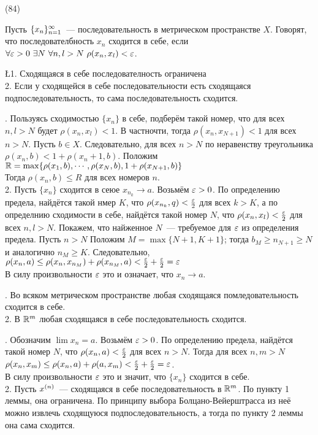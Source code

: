 (84)

\Op Пусть $\{x_{n}\}^{\infty}_{n = 1}$~--- последовательность в метрическом пространстве $X$. Говорят, что последователбность $x_n$ сходится в себе, если\\
$\forall \varepsilon > 0\ \exists N\ \forall n, l > N\ \rho(x_n, x_l) < \varepsilon$.

\L 1. Сходящаяся в себе последователность ограничена\\
2. Если у сходящейся в себе последовательности есть сходящаяся подпоследовательность, то сама последовательность сходится.

. Пользуясь сходимостью $\{x_n\}$ в себе, подберём такой номер, что для всех $n, l > N$ будет $\rho(x_n, x_l) < 1$. В частночти, тогда $\rho(x_n, x_{N + 1}) < 1$ для всех $n > N$. Пусть $b \in X$. Следовательно, для всех $n > N$ по неравенству треугольника $\rho(x_n, b) < 1 + \rho(x_n + 1, b)$. Положим\\
$\mathbb{R} = \max\{\rho(x_1, b), \cdots, \rho(x_N, b), 1 + \rho(x_{N + 1}, b)\}$\\
Тогда $\rho(x_n, b) \le R$ для всех номеров $n$.\\
2. Пусть $\{x_n\}$ сходится в сеюе $x_{n_k} \to a$. Возьмём $\varepsilon > 0$. По определению предела, найдётся такой нмер $K$, что $\rho(x_{n_k}, q) < \frac{\varepsilon}{2}$ для всех $k > K$, а по определнию сходимости в себе, найдётся такой номер $N$, что $\rho(x_n, x_l) < \frac{\varepsilon}{2}$ для всех $n, l > N$. Покажем, что найженное $N$~--- требуемое для $\varepsilon$ из определения предела. Пусть $n > N$ Положим $M = \max\{N +1, K +1\}$; тогда $b_M \ge n_{N + 1} \ge N$ и аналогично $n_M \ge K$. Следовательно,\\
$\rho(x_n, a) \le \rho(x_n, x_{n_M}) + \rho(x_{n_M}, a) < \frac{\varepsilon}{2} + \frac{\varepsilon}{2} = \varepsilon$\\
В силу произвольности $\varepsilon$ это и означает, что $x_n \to a$.

. Во всяком метрическом пространстве любая сходящаяся помледовательность сходится в себе.\\
2. В $\mathbb{R}^m$ любая сходящаяся в себе последовательность сходится.

. Обозначим $\lim x_n = a$. Возьмём $\varepsilon > 0$. По определению предела, найдётся такой номер $N$, что $\rho(x_n, a) < \frac{\varepsilon}{2}$ для всех $n > N$. Тогда для всех $n, m > N$\\
$\rho(x_n, x_m) \le \rho(x_n, a) + \rho(a, x_m) < \frac{\varepsilon}{2} + \frac{\varepsilon}{2} =\varepsilon$.\\
В силу произвольности $\varepsilon$ это и значит, что $\{x_n\}$ сходится в себе.\\
2. Пусть $x^{(n)}$~--- сходящаяся в себе последовательность в $\mathbb{R}^m$. По пункту 1 леммы, она ограничена. По принципу выбора Болцано-Вейерштрасса из неё можно извлечь сходящуюся подпоследовательность, а тогда по пункту 2 леммы она сама сходится.

